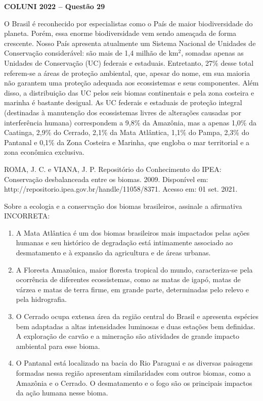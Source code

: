 \textbf{COLUNI 2022 -- Questão 29}\par\medskip O Brasil é reconhecido por especialistas como o País de maior biodiversidade do planeta. Porém, essa enorme biodiversidade vem sendo ameaçada de forma crescente. Nosso País apresenta atualmente um Sistema Nacional de Unidades de Conservação considerável: são mais de 1,4 milhão de km$^2$, somadas apenas as Unidades de Conservação (UC) federais e estaduais. Entretanto, 27\% desse total referem-se a áreas de proteção ambiental, que, apesar do nome, em sua maioria não garantem uma proteção adequada aos ecossistemas e seus componentes. Além disso, a distribuição das UC pelos seis biomas continentais e pela zona costeira e marinha é bastante desigual. As UC federais e estaduais de proteção integral (destinadas à manutenção dos ecossistemas livres de alterações causadas por interferência humana) correspondem a 9,8\% da Amazônia, mas a apenas 1,0\% da Caatinga, 2,9\% do Cerrado, 2,1\% da Mata Atlântica, 1,1\% do Pampa, 2,3\% do Pantanal e 0,1\% da Zona Costeira e Marinha, que engloba o mar territorial e a zona econômica exclusiva.

\par

ROMA, J. C. e VIANA, J. P. Repositório do Conhecimento do IPEA: Conservação desbalanceada entre os biomas. 2009. Disponível em: http://repositorio.ipea.gov.br/handle/11058/8371. Acesso em: 01 set. 2021.

\par

Sobre a ecologia e a conservação dos biomas brasileiros, assinale a afirmativa INCORRETA:\begin{enumerate}
\item A Mata Atlântica é um dos biomas brasileiros mais impactados pelas ações humanas e seu histórico de
      degradação está intimamente associado ao desmatamento e à expansão da agricultura e de áreas
      urbanas.
\item A Floresta Amazônica, maior floresta tropical do mundo, caracteriza-se pela ocorrência de diferentes
      ecossistemas, como as matas de igapó, matas de várzea e matas de terra firme, em grande parte,
      determinadas pelo relevo e pela hidrografia.
\item O Cerrado ocupa extensa área da região central do Brasil e apresenta espécies bem adaptadas a altas
      intensidades luminosas e duas estações bem definidas. A exploração de carvão e a mineração são
      atividades de grande impacto ambiental para esse bioma.
\item O Pantanal está localizado na bacia do Rio Paraguai e as diversas paisagens formadas nessa região
      apresentam similaridades com outros biomas, como a Amazônia e o Cerrado. O desmatamento e o fogo
      são os principais impactos da ação humana nesse bioma.\end{enumerate}
